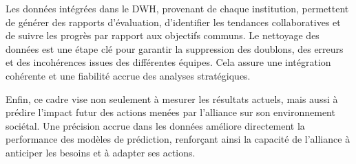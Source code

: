Les données intégrées dans le DWH, provenant de chaque institution, permettent de générer des rapports d’évaluation, d’identifier les tendances collaboratives et de suivre les progrès par rapport aux objectifs communs. Le nettoyage des données est une étape clé pour garantir la suppression des doublons, des erreurs et des incohérences issues des différentes équipes. Cela assure une intégration cohérente et une fiabilité accrue des analyses stratégiques.

Enfin, ce cadre vise non seulement à mesurer les résultats actuels, mais aussi à prédire l’impact futur des actions menées par l’alliance sur son environnement sociétal. Une précision accrue dans les données améliore directement la performance des modèles de prédiction, renforçant ainsi la capacité de l’alliance à anticiper les besoins et à adapter ses actions.
